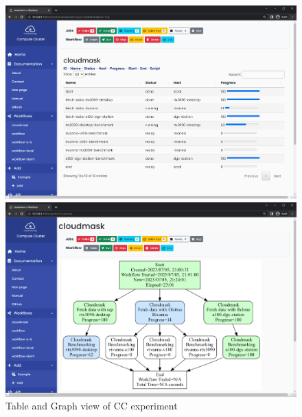 \documentclass[sigconf]{acmart}
\begin{document}
\begin{figure}[htb]
\begin{minipage}[t]{1.0\columnwidth}
\centering  \includegraphics[width=1.0\columnwidth]{images/table-cloudmask-workflow.png}
\end{minipage}
\hfill
\begin{minipage}[t]{1.0\columnwidth}
  \includegraphics[width=1.0\columnwidth]{images/gui-cloudmask-workflow.png}
\end{minipage}
 \caption{Table and Graph view of CC experiment}
\label{fig:gui-view}
\vspace{-0.5cm}
\end{figure}
\end{document}
